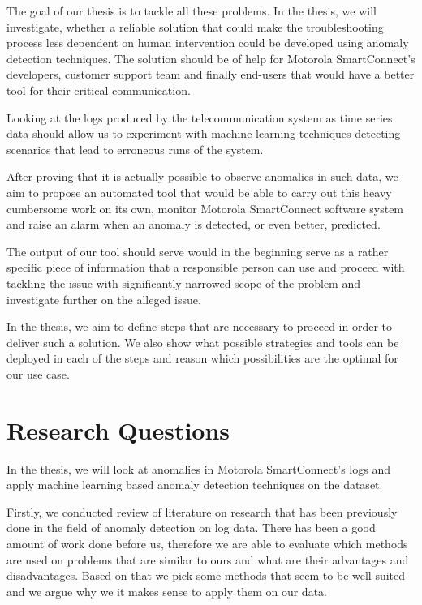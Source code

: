 The goal of our thesis is to tackle all these problems. 
In the thesis, we will investigate, whether a reliable solution that could make the troubleshooting process less dependent on human intervention could be developed using anomaly detection techniques.
The solution should be of help for Motorola SmartConnect's developers, customer support team and finally end-users that would have a better tool for their critical communication.

Looking at the logs produced by the telecommunication system as time series data should allow us to experiment with machine learning techniques detecting scenarios that lead to erroneous runs of the system.

After proving that it is actually possible to observe anomalies in such data, we aim to propose an automated tool that would be able to carry out this heavy cumbersome work on its own, monitor Motorola SmartConnect software system and raise an alarm when an anomaly is detected, or even better, predicted.

The output of our tool should serve would in the beginning serve as a rather specific piece of information that a responsible person can use and proceed with tackling the issue with significantly narrowed scope of the problem and investigate further on the alleged issue.

In the thesis, we aim to define steps that are necessary to proceed in order to deliver such a solution. We also show what possible strategies and tools can be deployed in each of the steps and reason which possibilities are the optimal for our use case.


\section{Research Questions}

In the thesis, we will look at anomalies in Motorola SmartConnect's logs and apply machine learning based anomaly detection techniques on the dataset.

Firstly, we conducted review of literature on research that has been previously done in the field of anomaly detection on log data. There has been a good amount of work done before us, therefore we are able to evaluate which methods are used on problems that are similar to ours and what are their advantages and disadvantages. Based on that we pick some methods that seem to be well suited and we argue why we it makes sense to apply them on our data.

